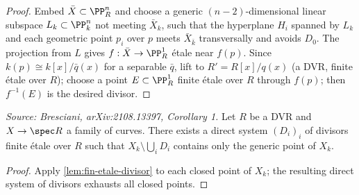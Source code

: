 \begin{proof}
  Embed \(\bar{X} \subset \PP^n_R\) and choose a generic \((n-2)\)-dimensional linear
  subspace \(L_k \subset \PP^n_k\) not meeting \(\bar{X}_k\), such that the
  hyperplane \(H_i\) spanned by \(L_k\) and each geometric point \(p_i\) over \(p\)
  meets \(\bar{X}_{\bar{k}}\) transversally and avoids \(D_0\). The projection from
  \(L\) gives \(f : \bar{X} \to \PP^1_R\) étale near \(f(p)\). Since
  \(k(p) \cong k[x]/\bar{q}(x)\) for a separable \(\bar{q}\), lift to
  \(R' = R[x]/q(x)\) (a DVR, finite étale over \(R\)); choose a point
  \(E \subset \PP^1_R\) finite étale over \(R\) through \(f(p)\); then
  \(f^{-1}(E)\) is the desired divisor.
\end{proof}

\begin{corollary}[CutLemma]
  \label{cor:cut}
  \textit{Source: Bresciani, arXiv:2108.13397, Corollary 1.}
  Let \(R\) be a DVR and \(X \to \spec R\) a family of curves. There exists a direct
  system \((D_i)_i\) of divisors finite étale over \(R\) such that
  \(X_k \setminus \bigcup_i D_i\) contains only the generic point of \(X_k\).
\end{corollary}

\begin{proof}
  Apply \cref{lem:fin-etale-divisor} to each closed point of \(X_k\); the resulting
  direct system of divisors exhausts all closed points.
\end{proof}

